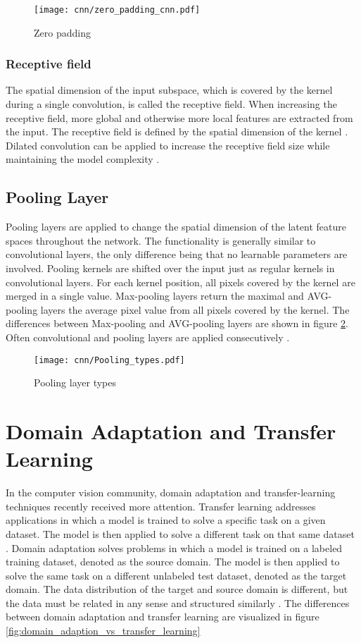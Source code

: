 \begin{figure}[H]
  \centering
  \texttt{[image: cnn/zero\_padding\_cnn.pdf]}
  \caption {Zero padding}
  \label{fig:zero_padding_cnn}
\end{figure}

\subsubsection{Receptive field}
The spatial dimension of the input subspace, which is covered by the kernel during a single convolution, is called the receptive field. When increasing the receptive field, more global and otherwise more local features are extracted from the input. The receptive field is defined by the spatial dimension of the kernel \cite{OShea2015}. Dilated convolution can be applied to increase the receptive field size while maintaining the model complexity \cite{Dai2017}. 

\subsection{Pooling Layer}
Pooling layers are applied to change the spatial dimension of the latent feature spaces throughout the network. The functionality is generally similar to convolutional layers, the only difference being that no learnable parameters are involved. Pooling kernels are shifted over the input just as regular kernels in convolutional layers. For each kernel position, all pixels covered by the kernel are merged in a single value. Max-pooling layers return the maximal and AVG-pooling layers the average pixel value from all pixels covered by the kernel. The differences between Max-pooling and AVG-pooling layers are shown in figure \ref{fig:Pooling_types}. Often convolutional and pooling layers are applied consecutively \cite{OShea2015}.

\begin{figure}[H]
  \centering
  \texttt{[image: cnn/Pooling\_types.pdf]}
  \caption {Pooling layer types}
  \label{fig:Pooling_types}
\end{figure}

\section{Domain Adaptation and Transfer Learning}

In the computer vision community, domain adaptation and transfer-learning techniques recently received more attention. Transfer learning addresses applications in which a model is trained to solve a specific task on a given dataset. The model is then applied to solve a different task on that same dataset \cite{Patel2015}. Domain adaptation solves problems in which a model is trained on a labeled training dataset, denoted as the source domain. The model is then applied to solve the same task on a different unlabeled test dataset, denoted as the target domain. The data distribution of the target and source domain is different, but the data must be related in any sense and structured similarly \cite{Patel2015}. The differences between domain adaptation and transfer learning are visualized in figure \ref{fig:domain_adaption_vs_transfer_learning}

